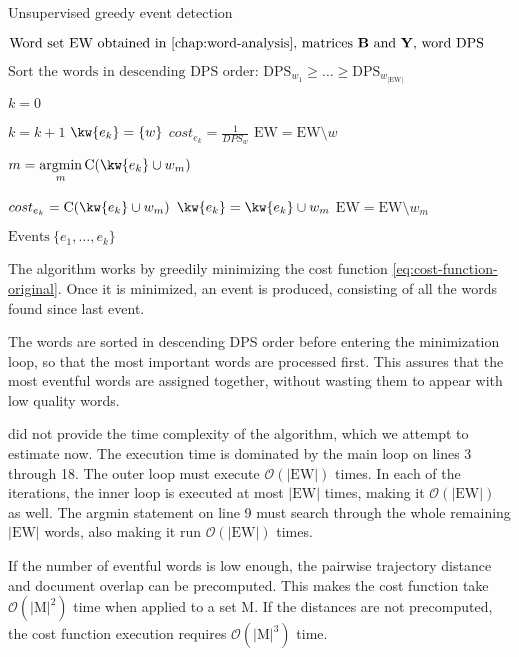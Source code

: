 \begin{algorithm}[H]
\begin{algorithmic}[1]
\caption{Unsupervised greedy event detection}
\label{alg:greedy-event-detection}
\Input $\text{Word set} ~ \text{EW obtained in \autoref{chap:word-analysis}, matrices } \bowmat \text{ and }\trajmat \text{, word DPS}$

\State $\text{Sort the words in descending DPS order: } \text{DPS}_{w_{1}} \geq \dots \geq \text{DPS}_{w_{\left\vert \text{EW} \right\vert}}$

\State $k = 0$

	\State $k = k + 1$	
	\State $\kw{e_{k}} = \{ w \}$
	\State $cost_{e_{k}} = \frac{1}{DPS_{w}}$
	\State $\text{EW} = \text{EW} \setminus w$
	
		\State $m = \argmin\limits_{m}{\text{C}( \kw{e_{k}} \cup w_{m} )}$

			\State $cost_{e_{k}} = \text{C}( \kw{e_{k}} \cup w_{m} )$
			\State $\kw{e_{k}} = \kw{e_{k}} \cup w_{m}$
			\State $\text{EW} = \text{EW} \setminus w_{m}$
		\Else
			\Break
		\EndIf
	\EndWhile
\EndFor

\Output $\text{Events} ~ \{ e_{1}, \dots, e_{k} \}$
\end{algorithmic}
\end{algorithm}

The algorithm works by greedily minimizing the cost function \eqref{eq:cost-function-original}. Once it is minimized, an event is produced, consisting of all the words found since last event.

The words are sorted in descending DPS order before entering the minimization loop, so that the most important words are processed first. This assures that the most eventful words are assigned together, without wasting them to appear with low quality words.

\cite{event-detection} did not provide the time complexity of the algorithm, which we attempt to estimate now. The execution time is dominated by the main loop on lines 3 through 18. The outer loop must execute $\mathcal{O}(|\text{EW}|)$ times. In each of the iterations, the inner loop is executed at most $|\text{EW}|$ times, making it $\mathcal{O}(|\text{EW}|)$ as well. The argmin statement on line 9 must search through the whole remaining $|\text{EW}|$ words, also making it run $\mathcal{O}(|\text{EW}|)$ times.

If the number of eventful words is low enough, the pairwise trajectory distance and document overlap can be precomputed. This makes the cost function take $\mathcal{O}(|\text{M}|^{2})$ time when applied to a set M. If the distances are not precomputed, the cost function execution requires $\mathcal{O}(|\text{M}|^{3})$ time.

